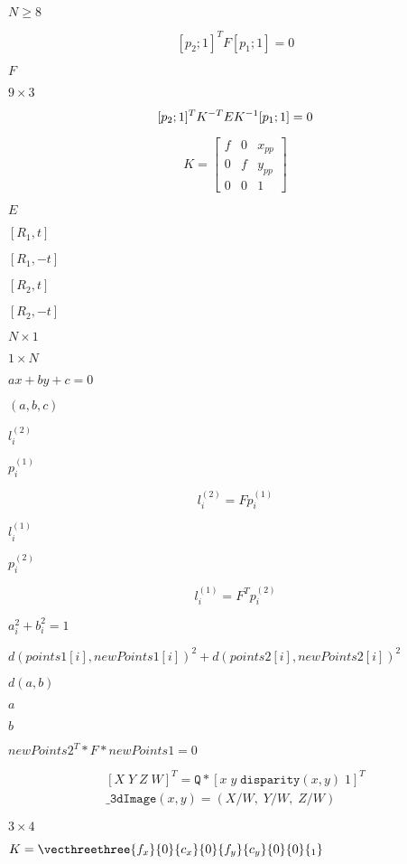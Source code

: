 \documentclass{article}
\begin{document}
$N \ge 8$
\pagebreak

\[[p_2; 1]^T F [p_1; 1] = 0\]
\pagebreak

$F$
\pagebreak

$9 \times 3$
\pagebreak

\[[p_2; 1]^T K^{-T} E K^{-1} [p_1; 1] = 0 \\\]
\pagebreak

\[K =
\begin{bmatrix}
f & 0 & x_{pp}  \\
0 & f & y_{pp}  \\
0 & 0 & 1
\end{bmatrix}\]
\pagebreak

$E$
\pagebreak

$[R_1, t]$
\pagebreak

$[R_1, -t]$
\pagebreak

$[R_2, t]$
\pagebreak

$[R_2, -t]$
\pagebreak

$N \times 1$
\pagebreak

$1 \times N$
\pagebreak

$ax + by + c=0$
\pagebreak

$(a, b, c)$
\pagebreak

$l^{(2)}_i$
\pagebreak

$p^{(1)}_i$
\pagebreak

\[l^{(2)}_i = F p^{(1)}_i\]
\pagebreak

$l^{(1)}_i$
\pagebreak

$p^{(2)}_i$
\pagebreak

\[l^{(1)}_i = F^T p^{(2)}_i\]
\pagebreak

$a_i^2+b_i^2=1$
\pagebreak

$d(points1[i], newPoints1[i])^2 + d(points2[i],newPoints2[i])^2$
\pagebreak

$d(a,b)$
\pagebreak

$a$
\pagebreak

$b$
\pagebreak

$newPoints2^T * F * newPoints1 = 0$
\pagebreak

\[\begin{array}{l} [X \; Y \; Z \; W]^T =  \texttt{Q} *[x \; y \; \texttt{disparity} (x,y) \; 1]^T  \\ \texttt{\_3dImage} (x,y) = (X/W, \; Y/W, \; Z/W) \end{array}\]
\pagebreak

$3 \times 4$
\pagebreak

$K = \vecthreethree{f_x}{0}{c_x}{0}{f_y}{c_y}{0}{0}{_1}$
\pagebreak
\end{document}

